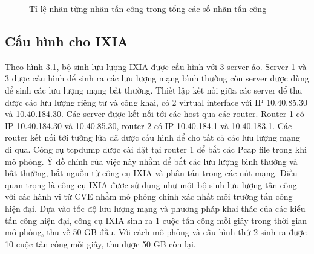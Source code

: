 \newcount\ind {}
    \begin{figure}[H]
        \centering
    \caption{Tỉ lệ nhãn từng nhãn tấn công trong tổng các số nhãn tấn công}
\end{figure}

\subsection{Cấu hình cho IXIA}
Theo hình 3.1, bộ sinh lưu lượng IXIA được cấu hình với 3 server ảo. Server 1 và 3 được cấu hình để sinh ra các lưu lượng mạng bình thường còn server được dùng để sinh các lưu lượng mạng bất thường. Thiết lập kết nối giữa các server để thu được các lưu lượng riêng tư và công khai, có 2 virtual interface với IP 10.40.85.30 và 10.40.184.30. Các server được kết nối tới các host qua các router. Router 1 có IP 10.40.184.30 và 10.40.85.30, router 2 có IP 10.40.184.1 và 10.40.183.1. Các router kết nối tới tường lửa đã được cấu hình để cho tất cả các lưu lượng mạng đi qua. Công cụ tcpdump được cài đặt tại router 1 để bắt các Pcap file trong khi mô phỏng. Ý đồ chính của việc này nhằm để bắt các lưu lượng bình thường và bất thường, bắt nguồn từ công cụ IXIA và phân tán trong các nút mạng. Điều quan trọng là công cụ IXIA được sử dụng như một bộ sinh lưu lượng tấn công với các hành vi từ CVE nhằm mô phỏng chính xác nhất môi trường tấn công hiện đại. Dựa vào tốc độ lưu lượng mạng và phương pháp khai thác của các kiểu tấn công hiện đại, công cụ IXIA sinh ra 1 cuộc tấn công mỗi giây trong thời gian mô phỏng, thu về 50 GB đầu. Với cách mô phỏng và cấu hình thứ 2 sinh ra được 10 cuộc tấn công mỗi giây, thu được 50 GB còn lại.


